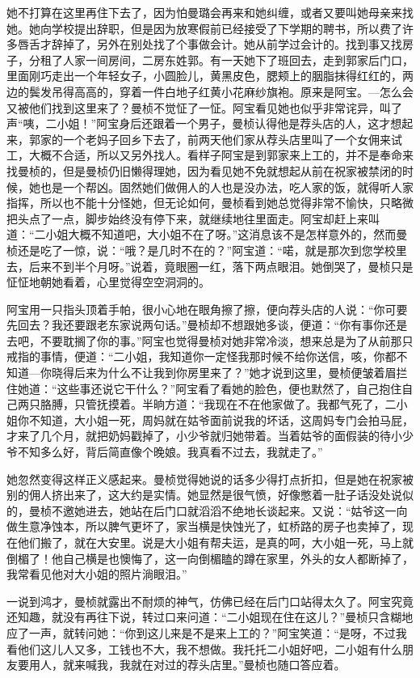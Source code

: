 \par 她不打算在这里再住下去了，因为怕曼璐会再来和她纠缠，或者又要叫她母亲来找她。她向学校提出辞职，但是因为放寒假前已经接受了下学期的聘书，所以费了许多唇舌才辞掉了，另外在别处找了个事做会计。她从前学过会计的。找到事又找房子，分租了人家一间房间，二房东姓郭。有一天她下了班回去，走到郭家后门口，里面刚巧走出一个年轻女子，小圆脸儿，黄黑皮色，腮颊上的胭脂抹得红红的，两边的鬓发吊得高高的，穿着一件白地子红黄小花麻纱旗袍。原来是阿宝。—怎么会又被他们找到这里来了？曼桢不觉怔了一怔。阿宝看见她也似乎非常诧异，叫了声“咦，二小姐！”阿宝身后还跟着一个男子，曼桢认得他是荐头店的人，这才想起来，郭家的一个老妈子回乡下去了，前两天他们家从荐头店里叫了一个女佣来试工，大概不合适，所以又另外找人。看样子阿宝是到郭家来上工的，并不是奉命来找曼桢的，但是曼桢仍旧懒得理她，因为看见她不免就想起从前在祝家被禁闭的时候，她也是一个帮凶。固然她们做佣人的人也是没办法，吃人家的饭，就得听人家指挥，所以也不能十分怪她，但无论如何，曼桢看到她总觉得非常不愉快，只略微把头点了一点，脚步始终没有停下来，就继续地往里面走。阿宝却赶上来叫道：“二小姐大概不知道吧，大小姐不在了呀。”这消息该不是怎样意外的，然而曼桢还是吃了一惊，说：“哦？是几时不在的？”阿宝道：“喏，就是那次到您学校里去，后来不到半个月呀。”说着，竟眼圈一红，落下两点眼泪。她倒哭了，曼桢只是怔怔地朝她看着，心里觉得空空洞洞的。
\par 阿宝用一只指头顶着手帕，很小心地在眼角擦了擦，便向荐头店的人说：“你可要先回去？我还要跟老东家说两句话。”曼桢却不想跟她多谈，便道：“你有事你还是去吧，不要耽搁了你的事。”阿宝也觉得曼桢对她非常冷淡，想来总是为了从前那只戒指的事情，便道：“二小姐，我知道你一定怪我那时候不给你送信，咳，你都不知道—你晓得后来为什么不让我到你房里来了？”她才说到这里，曼桢便皱着眉拦住她道：“这些事还说它干什么？”阿宝看了看她的脸色，便也默然了，自己抱住自己两只胳膊，只管抚摸着。半晌方道：“我现在不在他家做了。我都气死了，二小姐你不知道，大小姐一死，周妈就在姑爷面前说我的坏话，这周妈专门会拍马屁，才来了几个月，就把奶妈戳掉了，小少爷就归她带着。当着姑爷的面假装的待小少爷不知多么好，背后简直像个晚娘。我真看不过去，我就走了。”
\par 她忽然变得这样正义感起来。曼桢觉得她说的话多少得打点折扣，但是她在祝家被别的佣人挤出来了，这大约是实情。她显然是很气愤，好像憋着一肚子话没处说似的，曼桢不邀她进去，她站在后门口就滔滔不绝地长谈起来。又说：“姑爷这一向做生意净蚀本，所以脾气更坏了，家当横是快蚀光了，虹桥路的房子也卖掉了，现在他们搬了，就在大安里。说是大小姐有帮夫运，是真的呵，大小姐一死，马上就倒楣了！他自己横是也懊悔了，这一向倒楣瞌的蹲在家里，外头的女人都断掉了，我常看见他对大小姐的照片淌眼泪。”
\par 一说到鸿才，曼桢就露出不耐烦的神气，仿佛已经在后门口站得太久了。阿宝究竟还知趣，就没有再往下说，转过口来问道：“二小姐现在住在这儿？”曼桢只含糊地应了一声，就转问她：“你到这儿来是不是来上工的？”阿宝笑道：“是呀，不过我看他们这儿人又多，工钱也不大，我不想做。我托托二小姐好吧，二小姐有什么朋友要用人，就来喊我，我就在对过的荐头店里。”曼桢也随口答应着。
